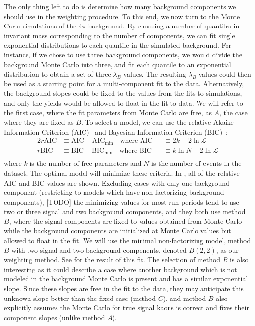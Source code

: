 The only thing left to do is determine how many background components we should use in the weighting procedure. To this end, we now turn to the Monte Carlo simulations of the $4\pi$-background. By choosing a number of quantiles in invariant mass corresponding to the number of components, we can fit single exponential distributions to each quantile in the simulated background. For instance, if we chose to use three background components, we would divide the background Monte Carlo into three, and fit each quantile to an exponential distribution to obtain a set of three $\lambda_B$ values. The resulting  $\lambda_B$ values could then be used as a starting point for a multi-component fit to the data. Alternatively, the background slopes could be fixed to the values from the fits to simulations, and only the yields would be allowed to float in the fit to data. We will refer to the first case, where the fit parameters from Monte Carlo are free, as $A$, the case where they are fixed as $B$. To select a model, we can use the relative Akaike Information Criterion (AIC)~\cite{akaike_information_1998} and Bayesian Information Criterion (BIC)~\cite{schwarz_estimating_1978}:
\begin{alignat}{2}
  r\text{AIC} &\equiv \text{AIC} - \text{AIC}_\text{min} \quad\text{where } \text{AIC} &&\equiv 2k - 2\ln\mathcal{L} \\
  r\text{BIC} &\equiv \text{BIC} - \text{BIC}_\text{min} \quad\text{where } \text{BIC} &&\equiv k\ln{N} - 2\ln\mathcal{L} \\
  \label{eq:information-criteria}
\end{alignat}
where $k$ is the number of free parameters and $N$ is the number of events in the dataset. The optimal model will minimize these criteria. In , all of the relative AIC and BIC values are shown. Excluding cases with only one background component (restricting to models which have non-factorizing background components), {\color{red}[TODO]} the minimizing values for most run periods tend to use two or three signal and two background components, and they both use method $B$, where the signal components are fixed to values obtained from Monte Carlo while the background components are initialized at Monte Carlo values but allowed to float in the fit. We will use the minimal non-factorizing model, method $B$ with two signal and two background components, denoted $B(2,2)$, as our weighting method. See  for the result of this fit. The selection of method $B$ is also interesting as it could describe a case where another background which is not modeled in the background Monte Carlo is present and has a similar exponential slope. Since these slopes are free in the fit to the data, they may anticipate this unknown slope better than the fixed case (method $C$), and method $B$ also explicitly assumes the Monte Carlo for true signal kaons is correct and fixes their component slopes (unlike method $A$).

